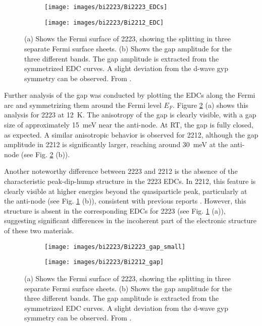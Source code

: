 \begin{figure}
	\centering
	\begin{subfigure}[b]{0.49\textwidth}
		\texttt{[image: images/bi2223/Bi2223\_EDCs]}
		\caption{}
	\end{subfigure}
	\hfill
	\begin{subfigure}[b]{0.49\textwidth}
		\texttt{[image: images/bi2223/Bi2212\_EDC]}
		\caption{}
	\end{subfigure}
	\caption{(a) Shows the Fermi surface of 2223, showing the splitting in three separate Fermi surface sheets. (b) Shows the gap amplitude for the three different bands. The gap amplitude is extracted from the symmetrized EDC curves. A slight deviation from the d-wave gyp symmetry can be observed. From \cite{luo_electronic_2023}.}
	\label{fig:edc_comparison}
\end{figure}

Further analysis of the gap was conducted by plotting the EDCs along the Fermi arc and symmetrizing them around the Fermi level $E_F$.
Figure \ref{fig:gap_bilayer} (a) shows this analysis for 2223 at \qty{12}{\kelvin}.
The anisotropy of the gap is clearly visible, with a gap size of approximately \qty{15}{\milli\electronvolt} near the anti-node.
At RT, the gap is fully closed, as expected.
A similar anisotropic behavior is observed for 2212, although the gap amplitude in 2212 is significantly larger, reaching around \qty{30}{\milli\electronvolt} at the anti-node (see Fig. \ref{fig:gap_bilayer} (b)).

Another noteworthy difference between 2223 and 2212 is the absence of the characteristic peak-dip-hump structure in the 2223 EDCs.
In 2212, this feature is clearly visible at higher energies beyond the quasiparticle peak, particularly at the anti-node (see Fig. \ref{fig:edc_comparison} (b)), consistent with previous reports \cite{kordyuk_origin_2002}.
However, this structure is absent in the corresponding EDCs for 2223 (see Fig. \ref{fig:edc_comparison} (a)), suggesting significant differences in the incoherent part of the electronic structure of these two materials.

\begin{figure}
	\centering
	\begin{subfigure}[b]{0.49\textwidth}
		\texttt{[image: images/bi2223/Bi2223\_gap\_small]}
		\caption{}
	\end{subfigure}
	\begin{subfigure}[b]{0.25\textwidth}
		\texttt{[image: images/bi2223/Bi2212\_gap]}
		\caption{}
	\end{subfigure}
	\caption{(a) Shows the Fermi surface of 2223, showing the splitting in three separate Fermi surface sheets. (b) Shows the gap amplitude for the three different bands. The gap amplitude is extracted from the symmetrized EDC curves. A slight deviation from the d-wave gyp symmetry can be observed. From \cite{luo_electronic_2023}.}
	\label{fig:gap_bilayer}
\end{figure}


